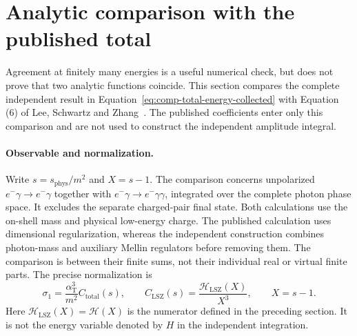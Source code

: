 \section{Analytic comparison with the published total}
\label{sec:compton-analytic-equivalence}

Agreement at finitely many energies is a useful numerical check, but does
not prove that two analytic functions coincide.  This section compares the complete independent result in
Equation~\eqref{eq:comp-total-energy-collected} with Equation (6) of Lee, Schwartz and
Zhang~\cite{qed-processes-lsz}.  The published coefficients enter only this
comparison and are not used to construct the independent amplitude integral.

\paragraph{Observable and normalization.}
Write $s=s_{\mathrm{phys}}/m^2$ and $X=s-1$.  The comparison concerns
unpolarized $e^-\gamma\to e^-\gamma$ together with
$e^-\gamma\to e^-\gamma\gamma$, integrated over the complete photon phase
space.  It excludes the separate charged-pair final state.  Both
calculations use the on-shell mass and physical low-energy charge.  The
published calculation uses dimensional regularization, whereas the
independent construction combines photon-mass and auxiliary Mellin
regulators before removing them.  The comparison is between their finite
sums, not their individual real or virtual finite parts.
The precise normalization is
\begin{equation}
 \sigma_1=\frac{\alpha_{\mathrm T}^3}{m^2}C_{\mathrm{total}}(s),\qquad
 C_{\mathrm{LSZ}}(s)=\frac{\mathcal H_{\mathrm{LSZ}}(X)}{X^3},\qquad X=s-1.
\end{equation}
Here $\mathcal H_{\mathrm{LSZ}}(X)=\mathcal H(X)$ is the numerator defined in the preceding section.  It is
not the energy variable denoted by $H$ in the independent integration.

